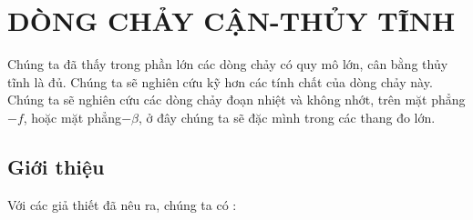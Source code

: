 \documentclass[DONG_HOC_KHI_QUYEN.tex]{subfiles}
\begin{document}
\chapter{DÒNG CHẢY CẬN-THỦY TĨNH}
Chúng ta đã thấy trong phần lớn các dòng chảy có quy mô lớn, cân bằng thủy tĩnh là đủ. Chúng ta sẽ nghiên cứu kỹ hơn các tính chất của dòng chảy này. Chúng ta sẽ nghiên cứu các dòng chảy đoạn nhiệt và không nhớt, trên mặt phẳng$-f$, hoặc mặt phẳng$-\beta$, ở đây chúng ta sẽ đặc mình trong các thang đo lớn.
\section{Giới thiệu}
Với các giả thiết đã nêu ra, chúng ta có :
\end{document}
